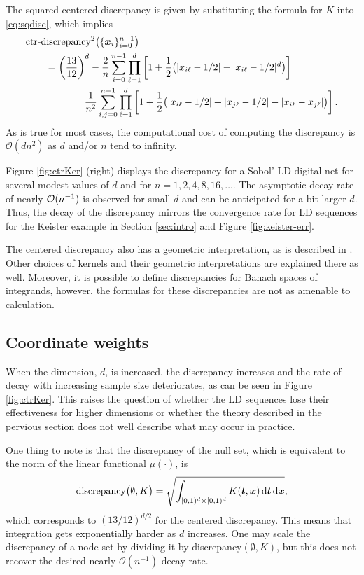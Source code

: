 \documentclass{svproc}
\begin{document}
The squared centered discrepancy is given by substituting the formula for $K$ into \eqref{eq:sqdisc}, which implies
\begin{align} \label{eq:ctrdisc}
	\nonumber
	\MoveEqLeft\text{ctr-discrepancy}^2\bigl(\{ \bsx_i\}_{i=0}^{n-1} \bigr) \\
	\nonumber
	&= \left ( \frac{13}{12} \right )^d
	- \frac 2n \sum_{i=0}^{n-1} \prod_{\ell=1}^d \left [ 1 + \frac 12 \bigl ( \lvert x_{i\ell} - 1/2 \rvert - \lvert x_{i\ell} - 1/2 \rvert^d \bigr )\right ] \\
	& \qquad \qquad \frac{1}{n^2} \sum_{i,j=0}^{n-1} \prod_{\ell = 1}^d \left[ 1 + \frac 12 \bigl ( \lvert x_{i\ell} - 1/2 \rvert + \lvert x_{j\ell} - 1/2 \rvert - \lvert x_{i\ell} - x_{j\ell} \rvert \bigr ) \right].
\end{align}
As is true for most cases, the computational cost of computing the discrepancy is $\mathcal{O}(dn^2)$ as $d$ and/or $n$ tend to infinity.

Figure  \ref{fig:ctrKer} (right)  displays the discrepancy for a Sobol' LD digital net for several modest values of $d$ and for $n =  1, 2, 4, 8, 16, \ldots$.  The asymptotic decay rate of nearly ${\mathcal{O}}(n^{-1})$ is observed for small $d$ and can be anticipated for a bit larger $d$.  Thus, the decay of the discrepancy mirrors the convergence rate for LD sequences for the Keister example in Section \ref{sec:intro} and Figure \ref{fig:keister-err}.


The centered discrepancy also has a geometric interpretation, as is described in \cite{Hic97a}. Other choices of kernels and their geometric interpretations are explained there as well.  Moreover, it is possible to define discrepancies for Banach spaces of integrands, however, the formulas for these discrepancies are not as amenable to calculation.


\subsection{Coordinate weights} \label{sec:coordwts}
When the dimension, $d$, is increased, the discrepancy increases and the rate of decay with increasing sample size deteriorates, as can be seen in Figure \ref{fig:ctrKer}. This raises the question of whether the LD sequences lose their effectiveness for higher dimensions or whether the theory described in the pervious section does not well describe what may occur in practice.

One thing to note is that the discrepancy of the null set, which is equivalent to the norm of the linear functional $\mu(\cdot)$, is
\begin{equation}
		\text{discrepancy}\bigl(\emptyset,K \bigr)  = \sqrt{\int_{[0,1)^d \times [0,1)^d} K({\boldsymbol{t}},{\boldsymbol{x}}) \, \mathrm{d} {\boldsymbol{t}} \, \mathrm{d} {\boldsymbol{x}}},
\end{equation}
which corresponds to $(13/12)^{d/2}$ for the centered discrepancy.  This means that integration gets exponentially harder as $d$ increases.  One may scale the discrepancy of a node set by dividing it by discrepancy$(\emptyset,K)$, but this does not recover the desired nearly $\mathcal{O}(n^{-1})$ decay rate.
\end{document}
